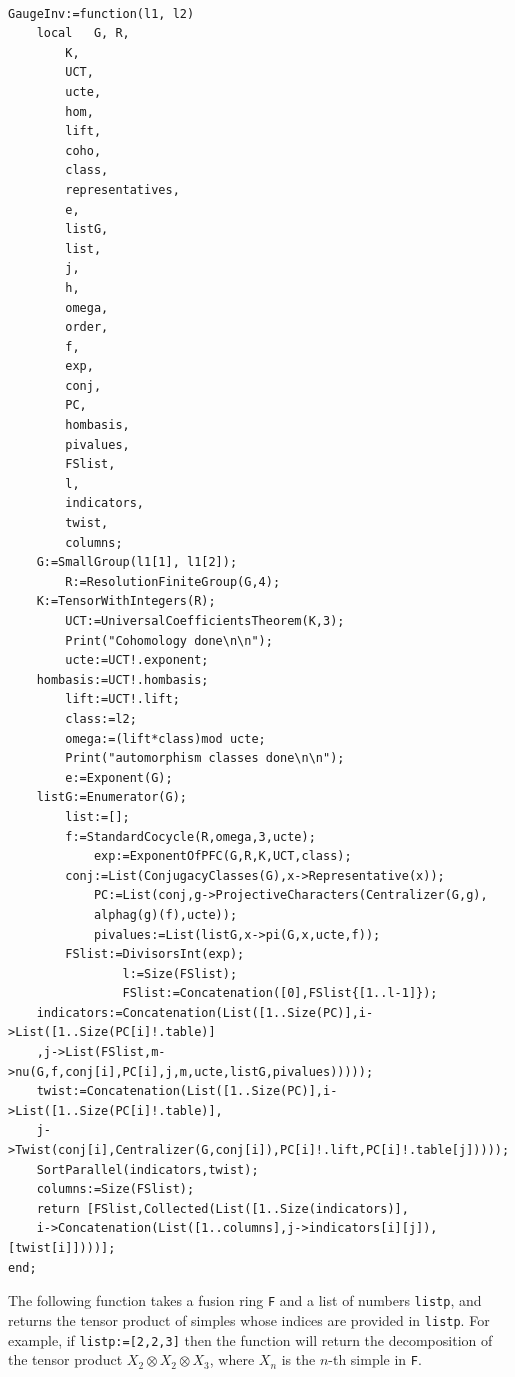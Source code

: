 \documentclass[a4paper, 10pt]{book}
\theoremstyle{definition}
\numberwithin{equation}{chapter}
\newcommand\lstl{\lstinline}
\newcommand\ot{\otimes}
\begin{document}
\begin{lstlisting}

GaugeInv:=function(l1, l2)
    local 	G, R,
		K,
		UCT,
		ucte,
		hom,
		lift,
		coho,
		class,
		representatives,
		e,
		listG,
		list,
		j,
		h,
		omega,
		order,
		f,
		exp,
		conj,
		PC,
        hombasis,
		pivalues,
		FSlist,
		l,
		indicators,
		twist,
		columns;
    G:=SmallGroup(l1[1], l1[2]);
    	R:=ResolutionFiniteGroup(G,4);
	K:=TensorWithIntegers(R);
    	UCT:=UniversalCoefficientsTheorem(K,3);
    	Print("Cohomology done\n\n");
    	ucte:=UCT!.exponent;
	hombasis:=UCT!.hombasis;
    	lift:=UCT!.lift;
    	class:=l2;
    	omega:=(lift*class)mod ucte;
    	Print("automorphism classes done\n\n");
    	e:=Exponent(G);
	listG:=Enumerator(G);
    	list:=[];
		f:=StandardCocycle(R,omega,3,ucte);
        	exp:=ExponentOfPFC(G,R,K,UCT,class);
		conj:=List(ConjugacyClasses(G),x->Representative(x));
        	PC:=List(conj,g->ProjectiveCharacters(Centralizer(G,g),
        	alphag(g)(f),ucte));
        	pivalues:=List(listG,x->pi(G,x,ucte,f));
		FSlist:=DivisorsInt(exp);
                l:=Size(FSlist);
                FSlist:=Concatenation([0],FSlist{[1..l-1]});
	indicators:=Concatenation(List([1..Size(PC)],i->List([1..Size(PC[i]!.table)]
 	,j->List(FSlist,m->nu(G,f,conj[i],PC[i],j,m,ucte,listG,pivalues)))));
  	twist:=Concatenation(List([1..Size(PC)],i->List([1..Size(PC[i]!.table)],
   	j->Twist(conj[i],Centralizer(G,conj[i]),PC[i]!.lift,PC[i]!.table[j]))));
   	SortParallel(indicators,twist);
   	columns:=Size(FSlist);
   	return [FSlist,Collected(List([1..Size(indicators)],
   	i->Concatenation(List([1..columns],j->indicators[i][j]),[twist[i]])))];	    	
end;
\end{lstlisting}
The following function takes a fusion ring \lstl{F} and a list of numbers \lstl{listp}, and returns the tensor product of simples whose indices are provided in \lstl{listp}. For example, if \lstl{listp:=[2,2,3]} then the function will return the decomposition of the tensor product $X_2 \ot X_2 \ot X_3$, where $X_n$ is the $n$-th simple in \lstl{F}.
\end{document}
